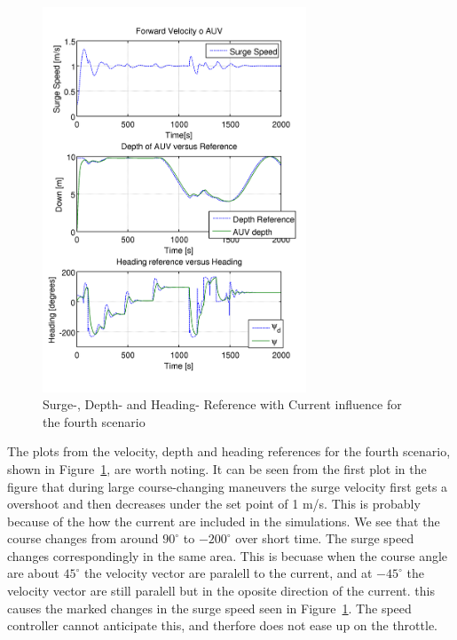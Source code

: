 		\begin{figure}[htbp]
			\centering
			\includegraphics[width=0.70\textwidth]{pics/4th_uDpsi}
			\caption{Surge-, Depth- and Heading- Reference with Current influence for the fourth
			scenario}
			\label{fig:ch3_4th_uDpsi}
		\end{figure}
		The plots from the velocity, depth and heading references for the fourth scenario, shown in
		Figure~\ref{fig:ch3_4th_uDpsi}, are worth noting. It can be seen from the first plot in the
		figure that during large course-changing maneuvers the surge velocity first gets a overshoot
		and then decreases under the set point of 1 m/s. This is probably because of the how the
		current are included in the simulations. We see that the course changes from around $90^\circ$
		to $-200^\circ$ over short time. The surge speed changes correspondingly in the same area.
		This is becuase when the course angle are about $45^\circ$ the velocity vector are paralell to
		the current, and at $-45^\circ$ the velocity vector are still paralell but in the oposite
		direction of the current. this causes the marked changes in the surge speed seen in
		Figure~\ref{fig:ch3_4th_uDpsi}. The speed controller cannot anticipate this, and therfore does
		not ease up on the throttle.



		


